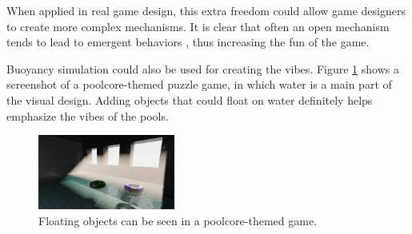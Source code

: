 When applied in real game design, this extra freedom could allow game designers to create more complex mechanisms.
It is clear that often an open mechanism tends to lead to emergent behaviors \cite{sweetser2006emergent}, thus increasing the fun of the game.

Buoyancy simulation could also be used for creating the vibes.
Figure \ref{floating-donut-in-game} shows a screenshot of a poolcore-themed puzzle game, in which water is a main part of the visual design.
Adding objects that could float on water definitely helps emphasize the vibes of the pools.

\begin{figure}[H]
	\centering
	\includegraphics[width=0.4\textwidth]{../Thesis/figures/floating-donut-in-game.jpg}
	\caption{Floating objects can be seen in a poolcore-themed game.}
	\label{floating-donut-in-game}
\end{figure}